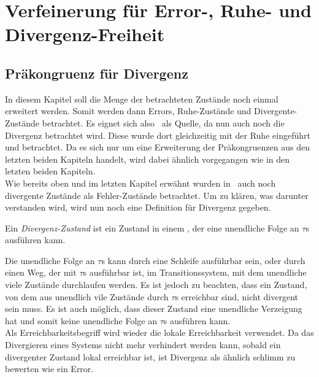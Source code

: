 \chapter{Verfeinerung für Error-, Ruhe- und Divergenz-Freiheit}

\section{Präkongruenz für Divergenz}

In diesem Kapitel soll die Menge der betrachteten Zustände noch einmal
erweitert werden. Somit werden dann Errors, Ruhe-Zustände und
Divergente-Zustände betrachtet. Es eignet sich also~\cite{Chilton2013} als
Quelle, da nun auch noch die Divergenz betrachtet wird. Diese wurde dort
gleichzeitig mit der Ruhe eingeführt und betrachtet. Da es sich nur um eine
Erweiterung der Präkongruenzen aus den letzten beiden Kapiteln handelt, wird
dabei ähnlich vorgegangen wie in den letzten beiden Kapiteln.\\
Wie bereits oben und im letzten Kapitel erwähnt wurden in~\cite{Chilton2013}
auch noch divergente Zustände als Fehler-Zustände betrachtet. Um zu klären, was
darunter verstanden wird, wird nun noch eine Definition für Divergenz gegeben.

\begin{Def}[Divergenz]
  Ein \emph{Divergenz-Zustand} ist ein Zustand in einem \EIO{}, der eine
  unendliche Folge an $\tau$s ausführen kann.%
\end{Def}

Die unendliche Folge an $\tau$s kann durch eine Schleife ausführbar sein, oder
durch einen Weg, der mit $\tau$s ausführbar ist, im Transitionssystem, mit dem
unendliche viele Zustände durchlaufen werden. Es ist jedoch zu beachten, dass
ein Zustand, von dem aus unendlich vile Zustände durch $\tau$s erreichbar sind,
nicht divergent sein muss. Es ist auch möglich, dass dieser Zustand eine
unendliche Verzeigung hat und somit keine unendliche Folge an $\tau$s ausführen
kann.\\
Als Erreichbarkeitsbegriff wird wieder die lokale Erreichbarkeit verwendet.
Da das Divergieren eines Systems nicht mehr verhindert werden kann, sobald ein
divergenter Zustand lokal erreichbar ist, ist Divergenz als ähnlich
\glqq{}schlimm\grqq{} zu bewerten wie ein Error.


